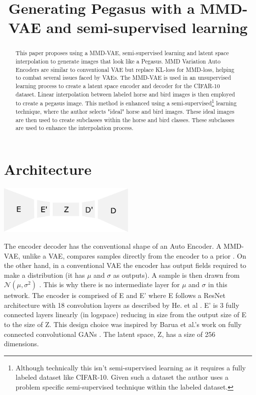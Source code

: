 \documentclass{article}
\title{Generating Pegasus with a MMD-VAE and semi-supervised learning}
\begin{document}
\maketitle
\begin{abstract}
    This paper proposes using a MMD-VAE, semi-supervised learning and latent space interpolation to generate images that look like a Pegasus. MMD Variation Auto Encoders are similar to conventional VAE but replace KL-loss for MMD-loss, helping to combat several issues faced by VAEs. The MMD-VAE is used in an unsupervised learning process to create a latent space encoder and decoder for the CIFAR-10 dataset. Linear interpolation between labeled horse and bird images is then employed to create a pegasus image. This method is enhanced using a semi-supervised\footnote{Although technically this isn't semi-supervised learning as it requires a fully labeled dataset like CIFAR-10. Given such a dataset the author uses a problem specific semi-supervised technique within the labeled dataset.} learning technique, where the author selects "ideal" horse and bird images. These ideal images are then used to create subclasses within the horse and bird classes. These subclasses are used to enhance the interpolation process.

\end{abstract}

\section{Architecture}
\begin{center}
    \includegraphics[width=0.5\textwidth]{figures/Encoder.png}
\end{center}
The encoder decoder has the conventional shape of an Auto Encoder.
A MMD-VAE, unlike a VAE, compares samples directly from the encoder to a prior \cite{infovae}. On the other hand, in a conventional VAE the encoder has output fields required to make a distribution (it has $\mu$ and $\sigma$ as outputs). A sample is then drawn from $\mathcal{N}(\mu, \sigma^2)$ \cite{vae}. This is why there is no intermediate layer for $\mu$ and $\sigma$ in this network.
The encoder is comprised of E and E' where E follows a ResNet architecture with 18 convolution layers as described by He. et al \cite{ResNet}. E' is 3 fully connected layers linearly (in logspace) reducing in size from the output size of E to the size of Z. This design choice was inspired by Barua et al.'s work on fully connected convolutional GANs \cite{fccGAN}.  The latent space, Z, has a size of 256 dimensions. 
\end{document}
